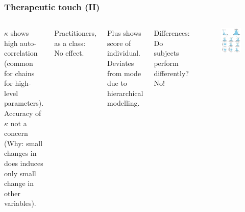 \documentclass[usenames,dvipsnames,table]{beamer}
\begin{document}
\begin{frame}
\frametitle{Therapeutic touch (II)}
\begin{columns}[c]
$\kappa$ shows high auto-correlation (common for chains for high-level parameters). Accuracy of $\kappa$ not a concern (Why: small changes in \kappa does induces only small change in other variables).

\vspace{1em}
Practitioners, as a class: No effect.

\vspace{1em}
Plus shows score of individual. Deviates from mode due to hierarchical modelling.

\vspace{1em}
Differences: Do subjects perform differently? No!

\begin{figure}
\centering
\includegraphics[width=\linewidth]{img/fig9_10}
\end{figure}
\end{columns}
\end{frame}
\end{document}
